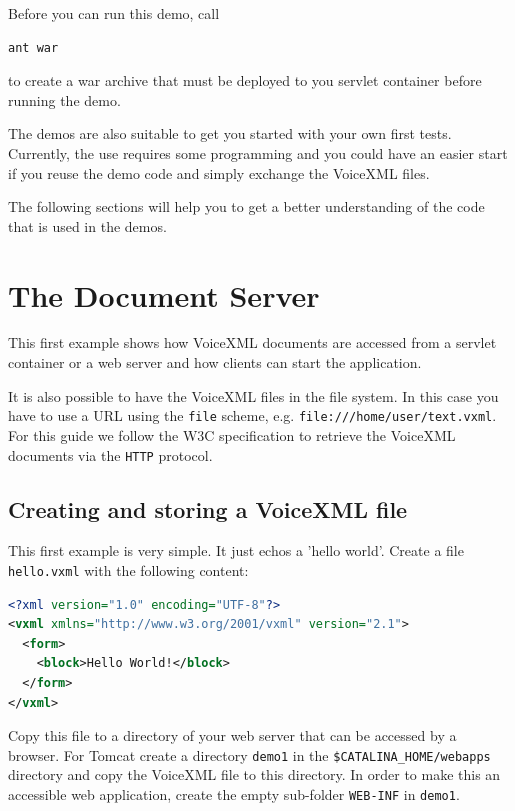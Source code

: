 \documentclass[11pt,a4paper]{book}
\begin{document}
Before you can run this demo, call

\begin{lstlisting}
ant war
\end{lstlisting}

to create a war archive that must be deployed to you servlet container
before running the demo.

The demos are also suitable to get you started with your own first tests.
Currently, the use requires some programming and you could have an easier
start if you reuse the demo code and simply exchange the VoiceXML files.

The following sections will help you to get a better understanding of the
code that is used in the demos.

\chapter{The Document Server}
\label{cha:document-server}

This first example shows how VoiceXML documents are accessed from a
servlet container or a web server and how clients can start the application.

It is also possible to have the VoiceXML files in the file system. In this case
you have to use a URL using the \lstinline{file} scheme, e.g.
\lstinline{file:///home/user/text.vxml}. For this guide we follow the W3C
specification to retrieve the VoiceXML documents via the \lstinline{HTTP}
protocol.

\section{Creating and storing a VoiceXML file}
\label{sec:hello-vxml}

This first example is very simple. It just echos a 'hello world'.
Create a file \texttt{hello.vxml} with the following content:

\begin{lstlisting}[language=XML]
<?xml version="1.0" encoding="UTF-8"?> 
<vxml xmlns="http://www.w3.org/2001/vxml" version="2.1">
  <form>
    <block>Hello World!</block>
  </form>
</vxml>
\end{lstlisting}

Copy this file to a directory of your web server that can be accessed
by a browser. For Tomcat create a directory \texttt{demo1} in
the \texttt{\$CATALINA\_HOME/webapps} directory and copy the VoiceXML
file to this directory. In order to make this
an accessible web application, create the empty sub-folder \texttt{WEB-INF}
in \texttt{demo1}.
\end{document}
